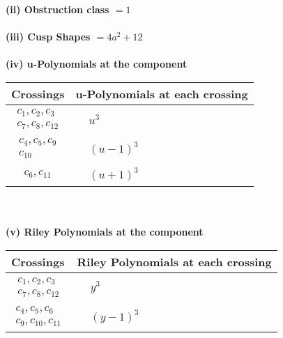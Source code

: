 \documentclass[1p]{elsarticle_modified}
\theoremstyle{definition}
\begin{document}
\flushleft \textbf{(ii) Obstruction class $= 1$}\\~\\
\flushleft \textbf{(iii) Cusp Shapes $= 4 a^2+12$}\\~\\
\newpage\renewcommand{\arraystretch}{1}
\flushleft \textbf{(iv) u-Polynomials at the component}\newline \\
\begin{tabular}{m{50pt}|m{274pt}}
Crossings & \hspace{64pt}u-Polynomials at each crossing \\
\hline $$\begin{aligned}c_{1},c_{2},c_{3}\\c_{7},c_{8},c_{12}\end{aligned}$$&$\begin{aligned}
&u^3
\end{aligned}$\\
\hline $$\begin{aligned}c_{4},c_{5},c_{9}\\c_{10}\end{aligned}$$&$\begin{aligned}
&(u-1)^3
\end{aligned}$\\
\hline $$\begin{aligned}c_{6},c_{11}\end{aligned}$$&$\begin{aligned}
&(u+1)^3
\end{aligned}$\\
\hline
\end{tabular}\\~\\
\newpage\renewcommand{\arraystretch}{1}
\flushleft \textbf{(v) Riley Polynomials at the component}\newline \\
\begin{tabular}{m{50pt}|m{274pt}}
Crossings & \hspace{64pt}Riley Polynomials at each crossing \\
\hline $$\begin{aligned}c_{1},c_{2},c_{3}\\c_{7},c_{8},c_{12}\end{aligned}$$&$\begin{aligned}
&y^3
\end{aligned}$\\
\hline $$\begin{aligned}c_{4},c_{5},c_{6}\\c_{9},c_{10},c_{11}\end{aligned}$$&$\begin{aligned}
&(y-1)^3
\end{aligned}$\\
\hline
\end{tabular}\\~\\
\end{document}

